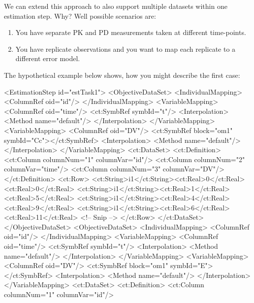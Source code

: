 \documentclass[a4paper,11pt]{article}
\begin{document}
We can extend this approach to also support multiple datasets within
one estimation step. Why? Well possible scenarios are:
\begin{enumerate}
\item You have separate PK and PD measurements taken at different
  time-points.
\item You have replicate observations and you want to map each
  replicate to a different error model.
\end{enumerate}
The hypothetical example below shows, how you might describe the first
case:
\begin{xmlcode}
<EstimationStep id="estTask1">
    <ObjectiveDataSet>
        <IndividualMapping>
            <ColumnRef oid="id"/>
        </IndividualMapping>
        <VariableMapping>
            <ColumnRef oid="time"/>
            <ct:SymbRef symbId="t"/>
            <Interpolation>
                <Method name="default"/>
            </Interpolation>
        </VariableMapping>
        <VariableMapping>
            <ColumnRef oid="DV"/>
            <ct:SymbRef block="om1" symbId="Cc"></ct:SymbRef>
            <Interpolation>
                <Method name="default"/>
            </Interpolation>
        </VariableMapping>
        <ct:DataSet>
            <ct:Definition>
                <ct:Column columnNum="1" columnVar="id"/>
                <ct:Column columnNum="2" columnVar="time"/>
                <ct:Column columnNum="3" columnVar="DV"/>
            </ct:Definition>
            <ct:Row>
                <ct:String>i1</ct:String><ct:Real>0</ct:Real><ct:Real>0</ct:Real>
                <ct:String>i1</ct:String><ct:Real>1</ct:Real><ct:Real>5</ct:Real>
                <ct:String>i1</ct:String><ct:Real>4</ct:Real><ct:Real>9</ct:Real>
                <ct:String>i1</ct:String><ct:Real>6</ct:Real><ct:Real>11</ct:Real>
                <!-- Snip -->
            </ct:Row>
        </ct:DataSet>
    </ObjectiveDataSet>
    <ObjectiveDataSet>
        <IndividualMapping>
            <ColumnRef oid="id"/>
        </IndividualMapping>
        <VariableMapping>
            <ColumnRef oid="time"/>
            <ct:SymbRef symbId="t"/>
            <Interpolation>
                <Method name="default"/>
            </Interpolation>
        </VariableMapping>
        <VariableMapping>
            <ColumnRef oid="DV"/>
            <ct:SymbRef block="om1" symbId="E"></ct:SymbRef>
            <Interpolation>
                <Method name="default"/>
            </Interpolation>
        </VariableMapping>
        <ct:DataSet>
            <ct:Definition>
                <ct:Column columnNum="1" columnVar="id"/>

\end{xmlcode}
\end{document}
